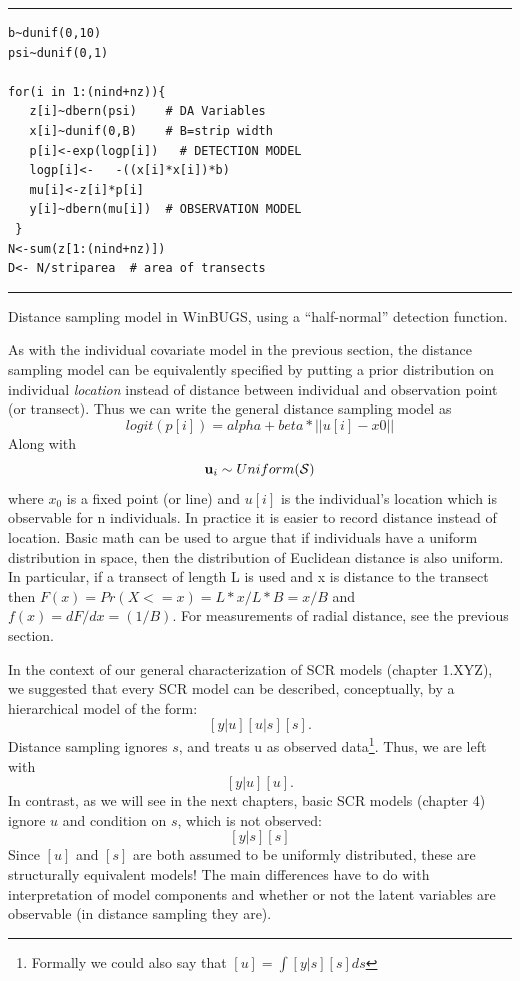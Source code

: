 \begin{panel}[htp]
\centering
\rule[0.15in]{\textwidth}{.03in}
\begin{minipage}{5in}
\begin{verbatim}
b~dunif(0,10)
psi~dunif(0,1)

for(i in 1:(nind+nz)){
   z[i]~dbern(psi)    # DA Variables
   x[i]~dunif(0,B)    # B=strip width
   p[i]<-exp(logp[i])   # DETECTION MODEL
   logp[i]<-   -((x[i]*x[i])*b)
   mu[i]<-z[i]*p[i]
   y[i]~dbern(mu[i])  # OBSERVATION MODEL
 }
N<-sum(z[1:(nind+nz)])
D<- N/striparea  # area of transects
\end{verbatim}
\end{minipage}
\rule[-0.15in]{\textwidth}{.03in}
\caption{Distance sampling model in WinBUGS, using a ``half-normal''
detection function.}
\label{panel.distance}
\end{panel}


As with the individual covariate model in the previous section, the distance sampling model can be equivalently specified by putting a prior distribution on individual {\it location} instead of distance between individual and observation point (or transect). 
Thus we can write the general distance sampling model as
\[
 logit(p[i]) = alpha + beta*||u[i] - x0||
\]
Along with
\[
 {\bf u}_{i} \sim Uniform({\cal S})
\]
where $x_{0}$ is a fixed point (or line) and $u[i]$ is the individual's location which is observable for n individuals. In practice it is easier to record distance instead of location.  Basic math can be used to argue that if individuals have a uniform distribution in space, then the distribution of Euclidean distance is also uniform. In particular, if a transect of length L is used and x is distance to the transect then $F(x) = Pr(X<=x) = L*x/L*B = x/B$ and $f(x) = dF/dx = (1/B)$. For measurements of radial distance, see the previous section. 

In the context of our general characterization of SCR models (chapter 1.XYZ), we suggested that every SCR model can be described, conceptually, by a hierarchical model of the form:
\[
 [y|u][u|s][s].
\]
Distance sampling ignores $s$, and treats u as observed data\footnote{Formally we could also say that $[u] = \int [y|s][s] ds$}. Thus, we are left with
\[
[y|u][u].
\]
In contrast, as we will see in the next chapters, basic SCR models (chapter 4) ignore $u$ and condition on $s$, which is not observed:
\[
[y|s][s]
\]
Since $[u]$ and $[s]$ are both assumed to be uniformly distributed, these are structurally equivalent  models! The main  differences have to do with interpretation of model components and whether or not the latent variables are observable (in distance sampling they are). 

